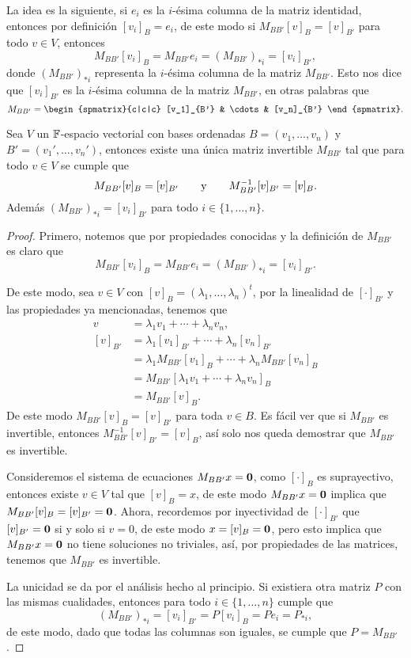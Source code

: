 La idea es la siguiente, si $e_i$ es la $i$-ésima columna de la matriz identidad, entonces por definición $[v_i]_B = e_i$, de este modo si $M_{BB'} [v]_B = [v]_{B'}$ para todo $v \in V$, entonces
  \[ M_{BB'} [v_i]_B = M_{BB'} e_i = (M_{BB'})_{*i} = [v_i]_{B'},\]
donde $(M_{BB'})_{*i}$ representa la $i$-ésima columna de la matriz $M_{BB'}$.
Esto nos dice que $[v_i]_{B'}$ es la $i$-ésima columna de la matriz $M_{BB'}$, en otras palabras que
  \[ M_{BB'} = \begin{spmatrix}{c|c|c}  [v_1]_{B'} & \cdots & [v_n]_{B'}  \end{spmatrix}. \]

\begin{teor} \label{teor:CambioBase}
  Sea $V$ un $\mathbb{F}$-espacio vectorial con bases ordenadas $B = (v_1,\ldots,v_n)$ y $B' = (v_1',\ldots,v_n')$, entonces existe una única matriz invertible $M_{BB'}$ tal que para todo $v \in V$ se cumple que
    \[ M_{BB'}[v]_B = [v]_{B'} \qquad\text{y}\qquad M_{BB'}^{-1}[v]_{B'} = [v]_B. \]
  Además $(M_{BB'})_{*i} = [v_i]_{B'}$ para todo $i \in \{1,\ldots,n\}$.
\end{teor}
\begin{proof}
  Primero, notemos que por propiedades conocidas y la definición de $M_{BB'}$ es claro que 
    \[ M_{BB'}[v_i]_B = M_{BB'} e_i =  (M_{BB'})_{*i} = [v_i]_{B'}. \]

  De este modo, sea $v \in V$ con $[v]_B = (\lambda_1,\ldots,\lambda_n)^t$, por la linealidad de $[\cdot]_{B'}$ y las propiedades ya mencionadas, tenemos que
    \begin{align*}
      v        &= \lambda_1 v_1 + \cdots + \lambda_n v_n, \\
      [v]_{B'} &= \lambda_1 [v_1]_{B'} + \cdots + \lambda_n [v_n]_{B'} \\
               &= \lambda_1 M_{BB'}[v_1]_B + \cdots + \lambda_n M_{BB'}[v_n]_B \\
               &= M_{BB'} [\lambda_1 v_1 + \cdots + \lambda_n v_n ]_B \\
               &= M_{BB'} [ v ]_B.
    \end{align*}
  De este modo $M_{BB'}[v]_B = [v]_{B'}$ para toda $v \in B$. Es fácil ver que si $M_{BB'}$ es invertible, entonces $M_{BB'}^{-1}[v]_{B'} = [v]_B$, así solo nos queda demostrar que $M_{BB'}$ es invertible.
  
  Consideremos el sistema de ecuaciones $M_{BB'}x = \mathbf{0}$, como $[\cdot]_B$ es suprayectivo, entonces existe $v \in V$ tal que $[v]_B = x$, de este modo $M_{BB'}x = \mathbf{0}$ implica que $M_{BB'}[v]_B = [v]_{B'} = \mathbf{0}$. Ahora, recordemos por inyectividad de $[\cdot]_{B'}$ que $[v]_{B'} = \mathbf{0}$ si y solo si $v = 0$, de este modo $x = [v]_{B} = \mathbf{0}$, pero esto implica que $M_{BB'}x = \mathbf{0}$ no tiene soluciones no triviales, así, por propiedades de las matrices, tenemos que $M_{BB'}$ es invertible.

  La unicidad se da por el análisis hecho al principio. Si existiera otra matriz $P$ con las mismas cualidades, entonces para todo $i \in \{1,\ldots, n\}$ cumple que
  \[ (M_{BB'})_{*i} = [v_i]_{B'} = P[v_i]_{B} = Pe_i = P_{*i},\]
  de este modo, dado que todas las columnas son iguales, se cumple que $P = M_{BB'}$.
\end{proof}


